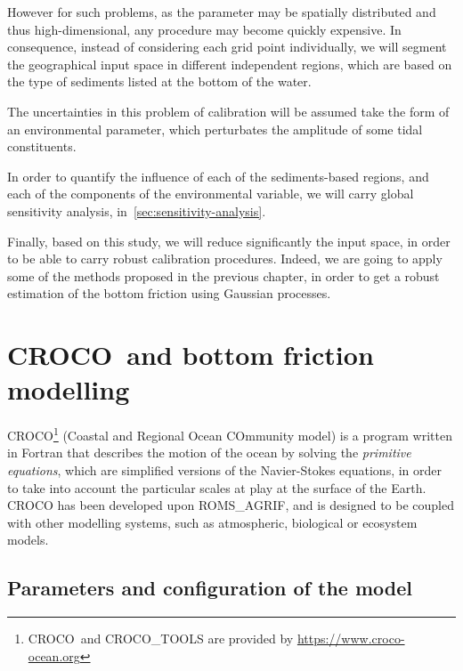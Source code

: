 \documentclass[../../Main_ManuscritThese.tex]{subfiles}
\newcommand{\CROCO}{CROCO}
\begin{document}
However for such problems, as the parameter may be spatially
distributed and thus high-dimensional, any procedure may become
quickly expensive.  In consequence, instead of considering each grid
point individually, we will segment the geographical input space in
different independent regions, which are based on the type of
sediments listed at the bottom of the water.

The uncertainties in this problem of calibration will be assumed take
the form of an environmental parameter, which perturbates the
amplitude of some tidal constituents.

In order to quantify the influence of each of the sediments-based
regions, and each of the components of the environmental variable, we
will carry global sensitivity analysis, in~\cref{sec:sensitivity-analysis}.

Finally, based on this study, we will reduce significantly the input
space, in order to be able to carry robust calibration
procedures. Indeed, we are going to apply some of the methods proposed
in the previous chapter, in order to get a robust estimation of the
bottom friction using Gaussian processes.



\section{\CROCO\ and bottom friction modelling}
\label{sec:croco_bottom_fr}
\CROCO{}\footnote{\CROCO\ and CROCO\_TOOLS are provided by
  \url{https://www.croco-ocean.org}} (Coastal and Regional Ocean
COmmunity model) is a program written in Fortran that describes the
motion of the ocean by solving the \emph{primitive equations}, which
are simplified versions of the Navier-Stokes equations, in order to
take into account the particular scales at play at the surface of the
Earth. \CROCO{} has been developed upon ROMS\_AGRIF, and is designed
to be coupled with other modelling systems, such as atmospheric,
biological or ecosystem models.



\subsection{Parameters and configuration of the model}
\label{sec:geographical_setting}
\end{document}
